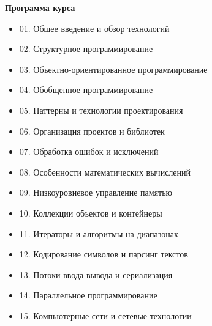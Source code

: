 \documentclass{beamer} %
\begin{document}
\begin{frame}{\bf Программа курса}

{\footnotesize

    \begin{itemize}

        \setlength\itemsep{0.1em}

        \item 01. Общее введение и обзор технологий

        \item 02. Структурное программирование

        \item 03. Объектно-ориентированное программирование

        \item 04. Обобщенное программирование

        \item 05. Паттерны и технологии проектирования

        \item 06. Организация проектов и библиотек

        \item 07. Обработка ошибок и исключений

        \item 08. Особенности математических вычислений

        \item 09. Низкоуровневое управление памятью

        \item 10. Коллекции объектов и контейнеры

        \item 11. Итераторы и алгоритмы на диапазонах

        \item 12. Кодирование символов и парсинг текстов

        \item 13. Потоки ввода-вывода и сериализация

        \item 14. Параллельное программирование

        \item 15. Компьютерные сети и сетевые технологии
        
    \end{itemize}
    
}

\end{frame}
\end{document}
